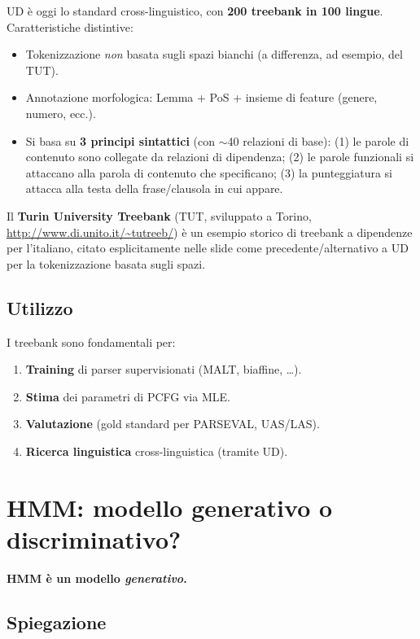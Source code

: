 \documentclass[12pt,a4paper]{article}
\begin{document}
UD è oggi lo standard cross-linguistico, con \textbf{200 treebank in 100 lingue}. Caratteristiche distintive:
\begin{itemize}[leftmargin=1.5em]
  \item Tokenizzazione \emph{non} basata sugli spazi bianchi (a differenza, ad esempio, del TUT).
  \item Annotazione morfologica: Lemma + PoS + insieme di feature (genere, numero, ecc.).
  \item Si basa su \textbf{3 principi sintattici} (con $\sim$40 relazioni di base): (1) le parole di contenuto sono collegate da relazioni di dipendenza; (2) le parole funzionali si attaccano alla parola di contenuto che specificano; (3) la punteggiatura si attacca alla testa della frase/clausola in cui appare.
\end{itemize}
Il \textbf{Turin University Treebank} (TUT, sviluppato a Torino, \url{http://www.di.unito.it/~tutreeb/}) è un esempio storico di treebank a dipendenze per l'italiano, citato esplicitamente nelle slide come precedente/alternativo a UD per la tokenizzazione basata sugli spazi.

\subsection{Utilizzo}

I treebank sono fondamentali per:
\begin{enumerate}[leftmargin=1.5em, label=\arabic*.]
  \item \textbf{Training} di parser supervisionati (MALT, biaffine, \dots).
  \item \textbf{Stima} dei parametri di PCFG via MLE.
  \item \textbf{Valutazione} (gold standard per PARSEVAL, UAS/LAS).
  \item \textbf{Ricerca linguistica} cross-linguistica (tramite UD).
\end{enumerate}

\section{HMM: modello generativo o discriminativo?}

\begin{defbox}
\textbf{HMM è un modello \emph{generativo}.}
\end{defbox}

\subsection{Spiegazione}
\end{document}
